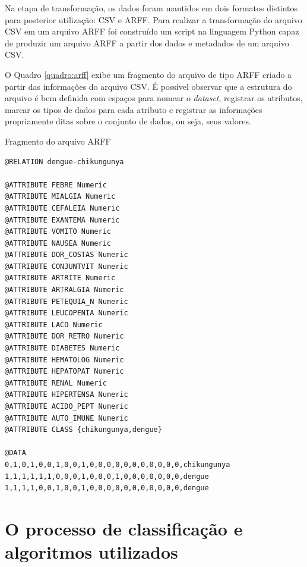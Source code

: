 Na etapa  de transformação, os dados foram mantidos em dois formatos distintos para posterior utilização: CSV e ARFF. Para realizar a transformação do arquivo CSV em um arquivo ARFF foi construído um script na linguagem Python capaz de produzir um arquivo ARFF a partir dos dados e metadados de um arquivo CSV.

O Quadro \ref{quadro:arff} exibe um fragmento do arquivo de tipo ARFF criado a partir das informações do arquivo CSV. É possível observar que a estrutura do arquivo é bem definida com espaços para nomear o \textit{dataset}, registrar os atributos, marcar os tipos de dados para cada atributo e registrar as informações propriamente ditas sobre o conjunto de dados, ou seja, seus valores.

\begin{quadro}
\caption{\label{quadro:arff}Fragmento do arquivo ARFF}
\begingroup
    \fontsize{10pt}{9pt}\selectfont
    \begin{verbatim}  
@RELATION dengue-chikungunya

@ATTRIBUTE FEBRE Numeric
@ATTRIBUTE MIALGIA Numeric
@ATTRIBUTE CEFALEIA Numeric
@ATTRIBUTE EXANTEMA Numeric
@ATTRIBUTE VOMITO Numeric
@ATTRIBUTE NAUSEA Numeric
@ATTRIBUTE DOR_COSTAS Numeric
@ATTRIBUTE CONJUNTVIT Numeric
@ATTRIBUTE ARTRITE Numeric
@ATTRIBUTE ARTRALGIA Numeric
@ATTRIBUTE PETEQUIA_N Numeric
@ATTRIBUTE LEUCOPENIA Numeric
@ATTRIBUTE LACO Numeric
@ATTRIBUTE DOR_RETRO Numeric
@ATTRIBUTE DIABETES Numeric
@ATTRIBUTE HEMATOLOG Numeric
@ATTRIBUTE HEPATOPAT Numeric
@ATTRIBUTE RENAL Numeric
@ATTRIBUTE HIPERTENSA Numeric
@ATTRIBUTE ACIDO_PEPT Numeric
@ATTRIBUTE AUTO_IMUNE Numeric
@ATTRIBUTE CLASS {chikungunya,dengue}

@DATA
0,1,0,1,0,0,1,0,0,1,0,0,0,0,0,0,0,0,0,0,0,chikungunya
1,1,1,1,1,1,0,0,0,1,0,0,0,1,0,0,0,0,0,0,0,dengue
1,1,1,1,0,0,1,0,0,1,0,0,0,0,0,0,0,0,0,0,0,dengue
    \end{verbatim}  
\endgroup
{}
\end{quadro}
\newpage

\section{O processo de classificação e algoritmos utilizados}

